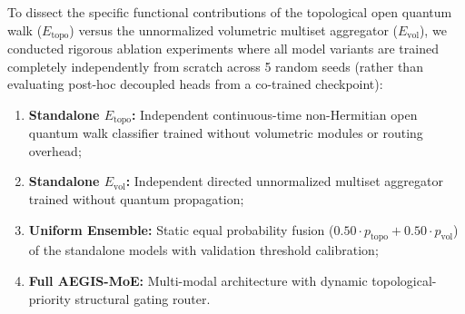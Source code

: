 \documentclass[10pt,twocolumn,letterpaper]{article}
\begin{document}
To dissect the specific functional contributions of the topological open quantum walk ($E_{\text{topo}}$) versus the unnormalized volumetric multiset aggregator ($E_{\text{vol}}$), we conducted rigorous ablation experiments where all model variants are trained completely independently from scratch across 5 random seeds (rather than evaluating post-hoc decoupled heads from a co-trained checkpoint):
\begin{enumerate}
    \item \textbf{Standalone $E_{\text{topo}}$:} Independent continuous-time non-Hermitian open quantum walk classifier trained without volumetric modules or routing overhead;
    \item \textbf{Standalone $E_{\text{vol}}$:} Independent directed unnormalized multiset aggregator trained without quantum propagation;
    \item \textbf{Uniform Ensemble:} Static equal probability fusion ($0.50 \cdot p_{\text{topo}} + 0.50 \cdot p_{\text{vol}}$) of the standalone models with validation threshold calibration;
    \item \textbf{Full AEGIS-MoE:} Multi-modal architecture with dynamic topological-priority structural gating router.
\end{enumerate}

\begin{table}[t]
\centering
\caption{MoE Dual-Expert Standalone Ablation Study Across Operational Regimes (Macro-F1 \% and Learned Routing)}
\label{tab:ablation_moe}
\small
{}
\end{table}
\end{document}
